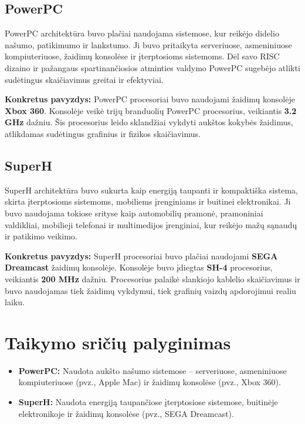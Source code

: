 \documentclass{article}
\begin{document}
\subsection{PowerPC}
PowerPC architektūra buvo plačiai naudojama sistemose, kur reikėjo didelio našumo, patikimumo ir lankstumo. Ji buvo pritaikyta serveriuose, asmeniniuose kompiuteriuose, žaidimų konsolėse ir įterptosioms sistemoms. Dėl savo RISC dizaino ir pažangaus spartinančiosios atminties valdymo PowerPC sugebėjo atlikti sudėtingus skaičiavimus greitai ir efektyviai.

\textbf{Konkretus pavyzdys:} PowerPC procesoriai buvo naudojami žaidimų konsolėje \textbf{Xbox 360}. Konsolėje veikė trijų branduolių PowerPC procesorius, veikiantis \textbf{3.2 GHz} dažniu. Šis procesorius leido sklandžiai vykdyti aukštos kokybės žaidimus, atlikdamas sudėtingus grafinius ir fizikos skaičiavimus.

\subsection{SuperH}
SuperH architektūra buvo sukurta kaip energiją taupanti ir kompaktiška sistema, skirta įterptosioms sistemoms, mobiliems įrenginiams ir buitinei elektronikai. Ji buvo naudojama tokiose srityse kaip automobilių pramonė, pramoniniai valdikliai, mobilieji telefonai ir multimedijos įrenginiai, kur reikėjo mažų sąnaudų ir patikimo veikimo.

\textbf{Konkretus pavyzdys:} SuperH procesoriai buvo plačiai naudojami \textbf{SEGA Dreamcast} žaidimų konsolėje. Konsolėje buvo įdiegtas \textbf{SH-4} procesorius, veikiantis \textbf{200 MHz} dažniu. Procesorius palaikė slankiojo kablelio skaičiavimus ir buvo naudojamas tiek žaidimų vykdymui, tiek grafinių vaizdų apdorojimui realiu laiku.

\section*{Taikymo sričių palyginimas}
\begin{itemize}
    \item \textbf{PowerPC:} Naudota aukšto našumo sistemose – serveriuose, asmeniniuose kompiuteriuose (pvz., Apple Mac) ir žaidimų konsolėse (pvz., Xbox 360).
    \item \textbf{SuperH:} Naudota energiją taupančiose įterptosiose sistemose, buitinėje elektronikoje ir žaidimų konsolėse (pvz., SEGA Dreamcast).
\end{itemize}


 
\end{document}
